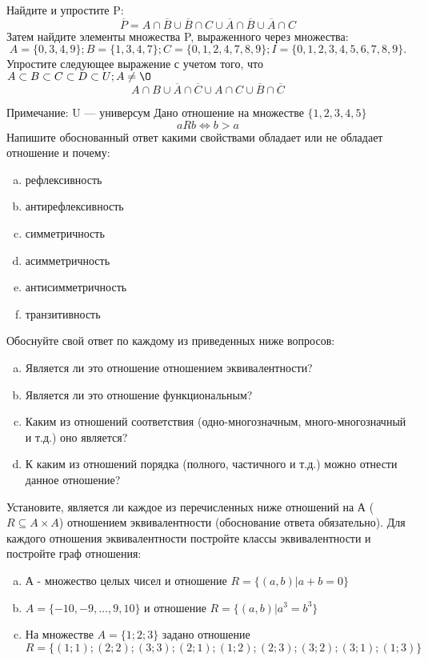 \documentclass[10pt]{exam}
\begin{document}
\begin{questions}
\question
Найдите и упростите P:
\begin{equation*}
\overline{P} = A \cap \overline{B} \cup \overline{B} \cap C \cup \overline{A} \cap \overline{B} \cup \overline{A} \cap C
\end{equation*}
Затем найдите элементы множества P, выраженного через множества:
\begin{equation*}
A = \{0, 3, 4, 9\}; 
B = \{1, 3, 4, 7\};
C = \{0, 1, 2, 4, 7, 8, 9\};
I = \{0, 1, 2, 3, 4, 5, 6, 7, 8, 9\}.
\end{equation*}\question
Упростите следующее выражение с учетом того, что $A\subset B \subset C \subset D \subset U; A \neq \O$
\begin{equation*}
A \cap B \cup \overline{A} \cap \overline{C} \cup A \cap C \cup \overline{B} \cap \overline{C}
\end{equation*}

Примечание: U — универсум\question
Дано отношение на множестве $\{1, 2, 3, 4, 5\}$ 
\begin{equation*}
aRb \iff b > a
\end{equation*}
Напишите обоснованный ответ какими свойствами обладает или не обладает отношение и почему:   
\begin{enumerate} [a)]\setcounter{enumi}{0}
\item рефлексивность
\item антирефлексивность
\item симметричность
\item асимметричность
\item антисимметричность
\item транзитивность
\end{enumerate}

Обоснуйте свой ответ по каждому из приведенных ниже вопросов:
\begin{enumerate} [a)]\setcounter{enumi}{0}
    \item Является ли это отношение отношением эквивалентности?
    \item Является ли это отношение функциональным?
    \item Каким из отношений соответствия (одно-многозначным, много-многозначный и т.д.) оно является?
    \item К каким из отношений порядка (полного, частичного и т.д.) можно отнести данное отношение?
\end{enumerate}

\question
Установите, является ли каждое из перечисленных ниже отношений на А ($R \subseteq A \times A$) отношением эквивалентности (обоснование ответа обязательно). Для каждого отношения эквивалентности 
постройте классы эквивалентности и постройте граф отношения:
\begin{enumerate}[a)]\setcounter{enumi}{0}
\item А - множество целых чисел и отношение $R = \{(a,b)|a + b = 0\}$
\item $A = \{-10, -9, …, 9, 10\}$ и отношение $R = \{(a,b)|a^{3} = b^{3}\}$
\item На множестве $A = \{1; 2; 3\}$ задано отношение $R = \{(1; 1); (2; 2); (3; 3); (2; 1); (1; 2); (2; 3); (3; 2); (3; 1); (1; 3)\}$


\end{enumerate}
\end{questions}
\end{document}
